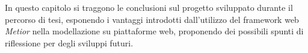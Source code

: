 In questo capitolo si traggono le conclusioni sul progetto sviluppato durante il percorso di tesi, esponendo i vantaggi introdotti
dall'utilizzo del framework web \emph{Metior} nella modellazione su piattaforme web, proponendo dei possibili spunti di riflessione
per degli sviluppi futuri.
